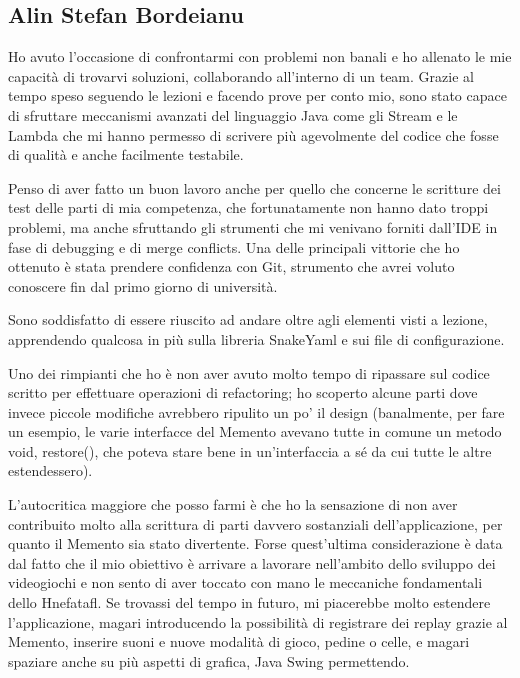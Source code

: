 \documentclass[a4paper,12pt]{report}
\begin{document}
\subsection{Alin Stefan Bordeianu}
Ho avuto l'occasione di confrontarmi con problemi non banali e ho allenato le mie capacità di trovarvi soluzioni, collaborando all'interno di un team. Grazie al tempo speso seguendo le lezioni e facendo prove per conto mio, sono stato capace di sfruttare meccanismi avanzati del linguaggio Java come gli Stream e le Lambda che mi hanno permesso di scrivere più agevolmente del codice che fosse di qualità e anche facilmente testabile.

Penso di aver fatto un buon lavoro anche per quello che concerne le scritture dei test delle parti di mia competenza, che fortunatamente non hanno dato troppi problemi, ma anche sfruttando gli strumenti che mi venivano forniti dall'IDE in fase di debugging e di merge conflicts. Una delle principali vittorie che ho ottenuto è stata prendere confidenza con Git, strumento che avrei voluto conoscere fin dal primo giorno di università. 

Sono soddisfatto di essere riuscito ad andare oltre agli elementi visti a lezione, apprendendo qualcosa in più sulla libreria SnakeYaml e sui file di configurazione. 

Uno dei rimpianti che ho è non aver avuto molto tempo di ripassare sul codice scritto per effettuare operazioni di refactoring; ho scoperto alcune parti dove invece piccole modifiche avrebbero ripulito un po' il design (banalmente, per fare un esempio, le varie interfacce del Memento avevano tutte in comune un metodo void, restore(), che poteva stare bene in un'interfaccia a sé da cui tutte le altre estendessero). 

L'autocritica maggiore che posso farmi è che ho la sensazione di non aver contribuito molto alla scrittura di parti davvero sostanziali dell'applicazione, per quanto il Memento sia stato divertente. Forse quest'ultima considerazione è data dal fatto che il mio obiettivo è arrivare a lavorare nell'ambito dello sviluppo dei videogiochi e non sento di aver toccato con mano le meccaniche fondamentali dello Hnefatafl. Se trovassi del tempo in futuro, mi piacerebbe molto estendere l'applicazione, magari introducendo la possibilità di registrare dei replay grazie al Memento, inserire suoni e nuove modalità di gioco, pedine o celle, e magari spaziare anche su più aspetti di grafica, Java Swing permettendo.
\end{document}
